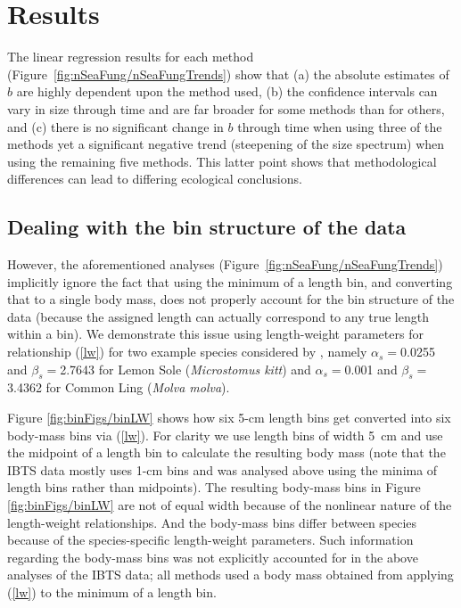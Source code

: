 \section{Results}

The linear regression results for each method (Figure~\ref{fig:nSeaFung/nSeaFungTrends}) show that
(a) the absolute estimates of
$b$ are highly dependent upon the method used, (b) the confidence intervals
can vary in size through time and are far broader for some methods than
for others,
and (c) there is no significant change in $b$ through time when
using three of the methods
yet a significant negative trend (steepening of the size spectrum)
when using the remaining five methods.
This latter point shows that
methodological differences can lead to
differing ecological conclusions.

\subsection{Dealing with the bin structure of the data}

However, the aforementioned analyses (Figure~\ref{fig:nSeaFung/nSeaFungTrends})
implicitly ignore the fact that using the
minimum of a length
bin, and converting that to a single body mass, does not properly account for
the bin structure of the data (because the assigned length can actually correspond to any true
length within a bin). We demonstrate this issue using length-weight parameters
for relationship (\ref{lw}) for two example species considered by \citet{blan05},
namely $\alpha_s= $0.0255 and $\beta_s=$2.7643 for Lemon Sole ({\it Microstomus
  kitt}) and $\alpha_s=$0.001 and $\beta_s=$3.4362 for Common Ling ({\it Molva
  molva}).


Figure \ref{fig:binFigs/binLW} shows how six 5-cm length bins get converted into
six body-mass bins via (\ref{lw}).
For clarity we use length bins of width 5~cm and use the midpoint of a
length bin to calculate the resulting body
mass (note that the IBTS data mostly uses 1-cm bins and
was analysed above using the minima of length bins rather than midpoints).
The resulting body-mass bins in Figure \ref{fig:binFigs/binLW} are not of equal
width because of the nonlinear nature of the length-weight relationships. And
the body-mass bins differ between species because of the species-specific
length-weight parameters. Such information regarding the body-mass bins was not
explicitly accounted for in the above analyses of the IBTS data; all methods
used a body mass obtained from applying (\ref{lw}) to the minimum of a length
bin.

